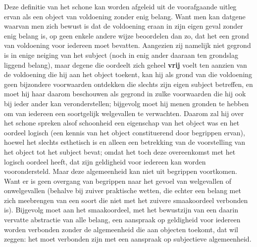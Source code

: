 Deze definitie van het schone kan worden afgeleid uit de voorafgaande uitleg ervan als een object van voldoening zonder enig belang. 
Want men kan datgene waarvan men zich bewust is dat de voldoening eraan in zijn eigen geval zonder enig belang is, op geen enkele andere wijze beoordelen dan zo, dat het een grond van voldoening voor iedereen moet bevatten. 
Aangezien zij namelijk niet gegrond is in enige neiging van het subject (noch in enig ander daaraan ten grondslag liggend belang), maar degene die oordeelt zich geheel \textbf{vrij} voelt ten aanzien van de voldoening die hij aan het object toekent, kan hij als grond van die voldoening geen bijzondere voorwaarden ontdekken die slechts zijn eigen subject betreffen, en moet hij haar daarom beschouwen als gegrond in zulke voorwaarden die hij ook bij ieder ander kan veronderstellen; bijgevolg moet hij menen gronden te hebben om van iedereen een soortgelijk welgevallen te verwachten.
Daarom zal hij over het schone spreken alsof schoonheid een eigenschap van het object was en het oordeel logisch (een kennis van het object constituerend door begrippen ervan), hoewel het slechts esthetisch is en alleen een betrekking van de voorstelling van het object tot het subject bevat; omdat het toch deze overeenkomst met het logisch oordeel heeft, dat zijn geldigheid voor iedereen kan worden voorondersteld. Maar deze algemeenheid kan niet uit begrippen voortkomen. Want er is geen overgang van begrippen naar het gevoel van welgevallen of onwelgevallen (behalve bij zuiver praktische wetten, die echter een belang met zich meebrengen van een soort die niet met het zuivere smaakoordeel verbonden is). Bijgevolg moet aan het smaakoordeel, met het bewustzijn van een daarin vervatte abstractie van alle belang, een aanspraak op geldigheid voor iedereen worden verbonden zonder de algemeenheid die aan objecten toekomt, dat wil zeggen: het moet verbonden zijn met een aanspraak op subjectieve algemeenheid.

